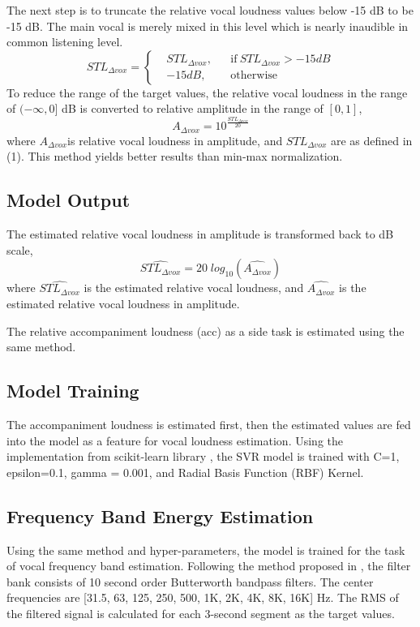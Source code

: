 \documentclass[conference]{IEEEtran}
\begin{document}
The next step is to truncate the relative vocal loudness values below -15 dB to be -15 dB. The main vocal is merely mixed in this level which is nearly inaudible in common listening level.
\begin{equation}
  STL_{\Delta vox} = \left \{
  \begin{aligned}
    &STL_{\Delta vox}, && \text{if}\ STL_{\Delta vox} > -15dB \\
    &-15 dB, && \text{otherwise}
  \end{aligned} \right.
\end{equation} To reduce the range of the target values, the relative vocal loudness in the range of $(-\infty, 0]$ dB is converted to relative amplitude in the range of $[0, 1]$,
\begin{equation} \label{eq2}
A_{\Delta vox} = 10^{\frac{STL_{\Delta vox}}{20}}
\end{equation}
where $A_{\Delta vox}$is relative vocal loudness in amplitude, and $STL_{\Delta vox}$ are as defined in (1). This method yields better results than min-max normalization.

\subsection{Model Output}
The estimated relative vocal loudness in amplitude is transformed back to dB  scale,
\begin{equation} \label{eq3}
\hat{STL_{\Delta vox}} = 20  \; log_{10}(\hat{A_{\Delta vox}})
\end{equation}
where $\hat{STL_{\Delta vox}}$ is the estimated relative vocal loudness, and $\hat{A_{\Delta vox}}$ is the estimated relative vocal loudness in amplitude.

The relative accompaniment loudness (acc) as a side task is estimated using the same method.

\subsection{Model Training}

The accompaniment loudness is estimated first, then the estimated values are fed into the model as a feature for vocal loudness estimation. Using the implementation from scikit-learn library \cite{scikit-learn}, the SVR model is trained with C=1, epsilon=0.1, gamma = 0.001, and Radial Basis Function (RBF) Kernel.

\subsection{Frequency Band Energy Estimation}
Using the same method and hyper-parameters, the model is trained for the task of vocal frequency band estimation. Following the method proposed in \cite{hafezi2015autonomous}, the filter bank consists of 10 second order Butterworth bandpass filters. The center frequencies are [31.5, 63, 125, 250, 500, 1K, 2K, 4K, 8K, 16K] Hz. The RMS of the filtered signal is calculated for each 3-second segment as the  target values.
\end{document}

